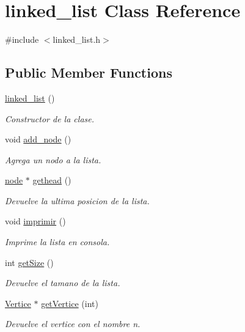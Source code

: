 \hypertarget{classlinked__list}{}\section{linked\+\_\+list Class Reference}
\label{classlinked__list}


{\ttfamily \#include $<$linked\+\_\+list.\+h$>$}

\subsection*{Public Member Functions}
\begin{DoxyCompactItemize}
\item 
\hyperlink{classlinked__list_ad79e40c8889aa821b0ceaa940642683d}{linked\+\_\+list} ()
\begin{DoxyCompactList}\small\item\em Constructor de la clase. \end{DoxyCompactList}\item 
void \hyperlink{classlinked__list_adbd71b912f6ba9dd33b55a3b734cf4d4}{add\+\_\+node} ()
\begin{DoxyCompactList}\small\item\em Agrega un nodo a la lista. \end{DoxyCompactList}\item 
\hyperlink{structnode}{node} $\ast$ \hyperlink{classlinked__list_a47943b95b9cab032a481e99205ff3b16}{gethead} ()
\begin{DoxyCompactList}\small\item\em Devuelve la ultima posicion de la lista. \end{DoxyCompactList}\item 
void \hyperlink{classlinked__list_aee520e460537321597159722d3817800}{imprimir} ()
\begin{DoxyCompactList}\small\item\em Imprime la lista en consola. \end{DoxyCompactList}\item 
int \hyperlink{classlinked__list_ab515294f7b7a88568952c35364b6af2c}{get\+Size} ()
\begin{DoxyCompactList}\small\item\em Devuelve el tamano de la lista. \end{DoxyCompactList}\item 
\hyperlink{structVertice}{Vertice} $\ast$ \hyperlink{classlinked__list_a0d08b49a5ce83730678bda38a735ae4e}{get\+Vertice} (int)
\begin{DoxyCompactList}\small\item\em Devuelve el vertice con el nombre n. \end{DoxyCompactList}\end{DoxyCompactItemize}


